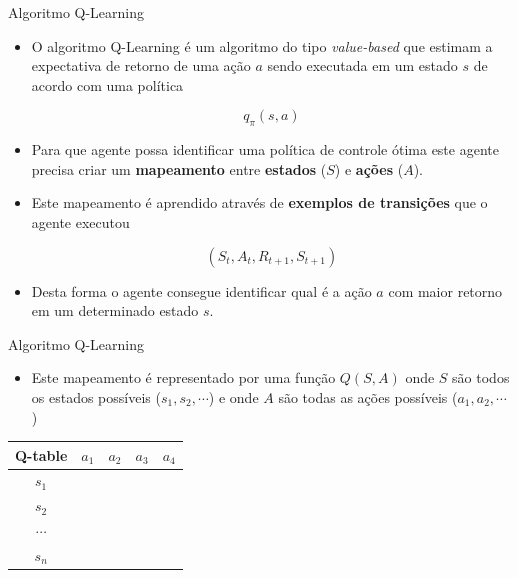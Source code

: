 \documentclass{beamer}
\begin{document}
\begin{frame}{Algoritmo Q-Learning}
	
	\begin{itemize}
		\item O algoritmo Q-Learning é um algoritmo do tipo \textit{value-based} que estimam a expectativa de retorno de uma ação $a$ sendo executada em um estado $s$ de acordo com uma política 
		
		\[
		q_{\pi}(s,a)
		\]
		
		
		
		\item Para que agente possa identificar uma política de controle ótima este agente 
		precisa criar um \textbf{mapeamento} entre \textbf{estados} ($S$) e \textbf{ações} ($A$).
		
		\item Este mapeamento é aprendido através de \textbf{exemplos de transições} que o agente executou 
		
		\[
		(S_t, A_t, R_{t+1}, S_{t+1})
		\]
		
		\item Desta forma o agente consegue identificar qual é a ação $a$ com maior retorno em um determinado estado $s$. 
	\end{itemize}

\end{frame}

\begin{frame}{Algoritmo Q-Learning}
	
\begin{itemize}
	
	\item Este mapeamento é representado por uma função $Q(S,A)$ onde $S$ são 
	todos os estados possíveis ($s_{1}, s_{2}, \cdots$) e onde $A$ são todas as 
	ações possíveis ($a_{1}, a_{2}, \cdots$)

\end{itemize}

	\begin{center}
	\begin{tabular}{ |c|c|c|c|c| } 
		\hline
		 \textbf{Q-table}  & $a_{1}$ & $a_{2}$ & $a_{3}$& $a_{4}$ \\
		 \hline
		$s_{1}$&  &  &  & \\ 
		\hline
		$s_{2}$&  &  &  & \\ 
\hline
		$\cdots$&  &  &  & \\ 
\hline
		$s_{n}$&  &  &  & \\ 
\hline
	\end{tabular}
\end{center}

\end{frame}
\end{document}
